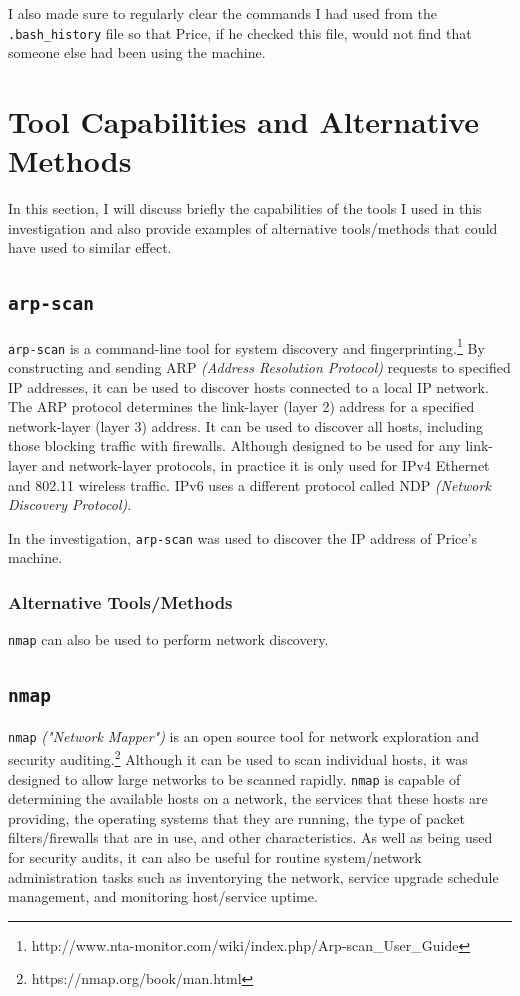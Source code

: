 \documentclass[12pt]{report}
\newcommand{\term}[1]{\colorbox{light-gray}{\texttt{#1}}}
\begin{document}
I also made sure to regularly clear the commands I had used from the \texttt{.bash\_history} file so that Price, if he checked this file, would not find that someone else had been using the machine.


\pagebreak
\chapter{Tool Capabilities and Alternative Methods}
In this section, I will discuss briefly the capabilities of the tools I used in this investigation and also provide examples of alternative tools/methods that could have used to similar effect.

\section{\texttt{arp-scan}}
\texttt{arp-scan} is a command-line tool for system discovery and fingerprinting.\footnote{http://www.nta-monitor.com/wiki/index.php/Arp-scan\_User\_Guide} By constructing and sending ARP \textit{(Address Resolution Protocol)} requests to specified IP addresses, it can be used to discover hosts connected to a local IP network. The ARP protocol determines the link-layer (layer 2) address for a specified network-layer (layer 3) address. It can be used to discover all hosts, including those blocking traffic with firewalls. Although designed to be used for any link-layer and network-layer protocols, in practice it is only used for IPv4 Ethernet and 802.11 wireless traffic. IPv6 uses a different protocol called NDP \textit{(Network Discovery Protocol)}.

In the investigation, \texttt{arp-scan} was used to discover the IP address of Price's machine.
\subsection*{Alternative Tools/Methods}
\texttt{nmap} can also be used to perform network discovery.

\section{\texttt{nmap}}
\texttt{nmap} \textit{("Network Mapper")} is an open source tool for network exploration and security auditing.\footnote{https://nmap.org/book/man.html} Although it can be used to scan individual hosts, it was designed to allow large networks to be scanned rapidly. \texttt{nmap} is capable of determining the available hosts on a network, the services that these hosts are providing, the operating systems that they are running, the type of packet filters/firewalls that are in use, and other characteristics. As well as being used for security audits, it can also be useful for routine system/network administration tasks such as inventorying the network, service upgrade schedule management, and monitoring host/service uptime.
\end{document}
